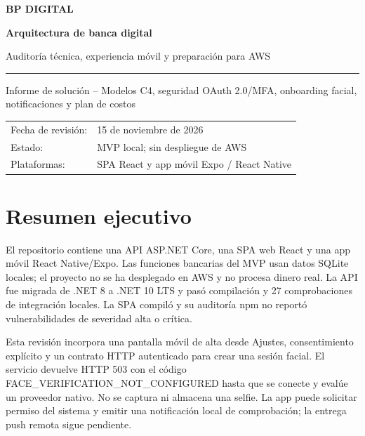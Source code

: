 \documentclass[11pt,a4paper]{report}
\begin{document}
\begin{titlepage}
\pagecolor{bpnavy}\color{white}
\vspace*{1.2cm}
{\Large\bfseries BP DIGITAL}\par
\vspace{2.8cm}
{\Huge\bfseries Arquitectura de banca digital}\par
\vspace{0.5cm}
{\LARGE Auditoría técnica, experiencia móvil y preparación para AWS}\par
\vspace{1.4cm}
\rule{0.8\textwidth}{1.2pt}\par
\vspace{1.0cm}
{\large Informe de solución -- Modelos C4, seguridad OAuth 2.0/MFA, onboarding facial, notificaciones y plan de costos}\par
\vfill
\begin{tabular}{@{}ll@{}}
\textcolor{white!75}{Fecha de revisión:} & 15 de noviembre de 2026 \\
\textcolor{white!75}{Estado:} & MVP local; sin despliegue de AWS \\
\textcolor{white!75}{Plataformas:} & SPA React y app móvil Expo / React Native \\
\end{tabular}
\vspace{1.2cm}
\end{titlepage}
\nopagecolor\color{bpink}
\tableofcontents
\clearpage

\chapter*{Resumen ejecutivo}
\begin{summarybox}
El repositorio contiene una API ASP.NET Core, una SPA web React y una app móvil React Native/Expo. Las funciones bancarias del MVP usan datos SQLite locales; el proyecto no se ha desplegado en AWS y no procesa dinero real. La API fue migrada de .NET 8 a .NET 10 LTS y pasó compilación y 27 comprobaciones de integración locales. La SPA compiló y su auditoría npm no reportó vulnerabilidades de severidad alta o crítica.
\end{summarybox}

Esta revisión incorpora una pantalla móvil de alta desde Ajustes, consentimiento explícito y un contrato HTTP autenticado para crear una sesión facial. El servicio devuelve HTTP 503 con el código FACE\_VERIFICATION\_NOT\_CONFIGURED hasta que se conecte y evalúe un proveedor nativo. No se captura ni almacena una selfie. La app puede solicitar permiso del sistema y emitir una notificación local de comprobación; la entrega push remota sigue pendiente.
\end{document}
